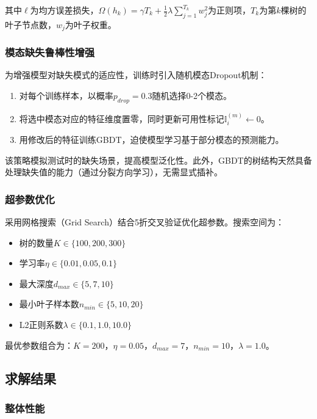 其中$\ell$为均方误差损失，$\Omega(h_k) = \gamma T_k + \frac{1}{2}\lambda \sum_{j=1}^{T_k} w_j^2$为正则项，$T_k$为第$k$棵树的叶子节点数，$w_j$为叶子权重。

\subsubsection{模态缺失鲁棒性增强}

为增强模型对缺失模式的适应性，训练时引入随机模态Dropout机制：

\begin{enumerate}
\item 对每个训练样本，以概率$p_{drop}=0.3$随机选择0-2个模态。
\item 将选中模态对应的特征维度置零，同时更新可用性标记$\mathbb{I}_i^{(m)} \leftarrow 0$。
\item 用修改后的特征训练GBDT，迫使模型学习基于部分模态的预测能力。
\end{enumerate}

该策略模拟测试时的缺失场景，提高模型泛化性。此外，GBDT的树结构天然具备处理缺失值的能力（通过分裂方向学习），无需显式插补。

\subsubsection{超参数优化}

采用网格搜索（Grid Search）结合5折交叉验证优化超参数。搜索空间为：

\begin{itemize}
\item 树的数量$K \in \{100, 200, 300\}$
\item 学习率$\eta \in \{0.01, 0.05, 0.1\}$
\item 最大深度$d_{max} \in \{5, 7, 10\}$
\item 最小叶子样本数$n_{min} \in \{5, 10, 20\}$
\item L2正则系数$\lambda \in \{0.1, 1.0, 10.0\}$
\end{itemize}

最优参数组合为：$K=200$，$\eta=0.05$，$d_{max}=7$，$n_{min}=10$，$\lambda=1.0$。

\subsection{求解结果}

\subsubsection{整体性能}


